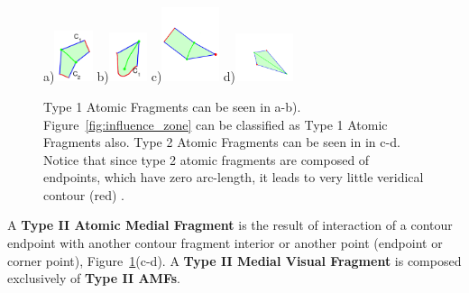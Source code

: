 \begin{figure}[ht]
  \center
  a)\includegraphics[width=0.1\textwidth]{figs/b2.pdf}
  b)\includegraphics[width=0.1\textwidth]{figs/a1.pdf}
  c)\includegraphics[width=0.15\textwidth]{figs/af_t3.pdf}
  d)\includegraphics[width=0.15\textwidth]{figs/af_t4.pdf}
  \caption{Type 1 Atomic Fragments can be seen in a-b). Figure~\ref{fig:influence_zone} can be classified as Type 1 Atomic Fragments also. Type 2 Atomic Fragments can be seen in in c-d. Notice that since type 2 atomic fragments are composed of endpoints, which have zero arc-length, it leads to very little veridical contour (red) .}
  \label{fig:af_types}
\end{figure}

\begin{definition}
A {\bf Type II Atomic Medial Fragment} is the result of interaction of a contour endpoint with another contour fragment interior or another point (endpoint or corner point), Figure~\ref{fig:af_types}(c-d). A {\bf Type II Medial Visual Fragment} is composed exclusively of {\bf Type II AMFs}. 
\end{definition}

